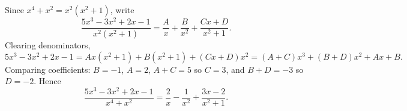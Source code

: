 Since $x^4+x^2=x^2(x^2+1)$, write
\[
\dfrac{5x^3-3x^2+2x-1}{x^2(x^2+1)}=\dfrac {A}{x}+\dfrac {B}{x^2}+\dfrac{Cx+D}{x^2+1}.
\]
Clearing denominators,
\[
5x^3-3x^2+2x-1=Ax(x^2+1)+B(x^2+1)+(Cx+D)x^2=(A+C)x^3+(B+D)x^2+Ax+B .
\]
Comparing coefficients: $B=-1$, $A=2$, $A+C=5$ so $C=3$, and $B+D=-3$ so $D=-2$. Hence
\[
\dfrac{5x^3-3x^2+2x-1}{x^4+x^2}=\boxed{\dfrac{2}{x}-\dfrac{1}{x^2}+\dfrac{3x-2}{x^2+1}}.
\]

